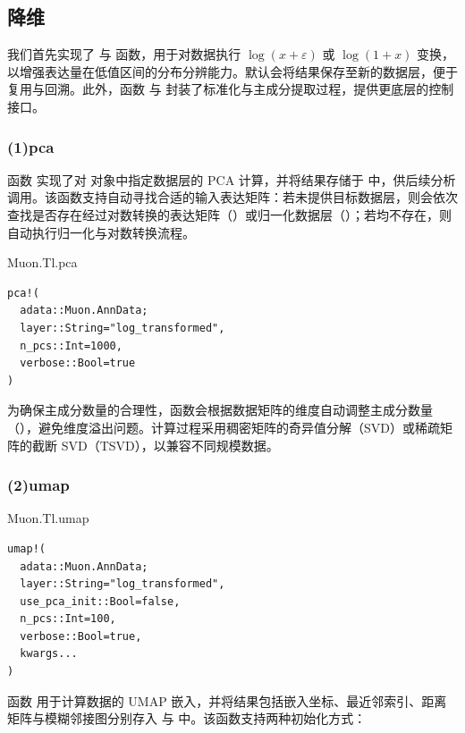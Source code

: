 \subsection{降维}

我们首先实现了  与  函数，用于对数据执行 $\log(x + \varepsilon)$ 或 $\log(1 + x)$ 变换，以增强表达量在低值区间的分布分辨能力。默认会将结果保存至新的数据层，便于复用与回溯。此外，函数  与  封装了标准化与主成分提取过程，提供更底层的控制接口。

\subsubsection{(1)pca}

函数  实现了对  对象中指定数据层的 PCA 计算，并将结果存储于  中，供后续分析调用。该函数支持自动寻找合适的输入表达矩阵：若未提供目标数据层，则会依次查找是否存在经过对数转换的表达矩阵（）或归一化数据层（）；若均不存在，则自动执行归一化与对数转换流程。

\begin{fancybox}{Muon.Tl.pca}
\begin{lstlisting}
pca!(
  adata::Muon.AnnData;
  layer::String="log_transformed",
  n_pcs::Int=1000,
  verbose::Bool=true
)
\end{lstlisting}
\end{fancybox}

为确保主成分数量的合理性，函数会根据数据矩阵的维度自动调整主成分数量（），避免维度溢出问题。计算过程采用稠密矩阵的奇异值分解（SVD）或稀疏矩阵的截断 SVD（TSVD），以兼容不同规模数据。

\subsubsection{(2)umap}

\begin{fancybox}{Muon.Tl.umap}
\begin{lstlisting}
umap!(
  adata::Muon.AnnData;
  layer::String="log_transformed",
  use_pca_init::Bool=false,
  n_pcs::Int=100,
  verbose::Bool=true,
  kwargs...
)
\end{lstlisting}
\end{fancybox}

函数  用于计算数据的 UMAP 嵌入，并将结果包括嵌入坐标、最近邻索引、距离矩阵与模糊邻接图分别存入  与  中。该函数支持两种初始化方式：

